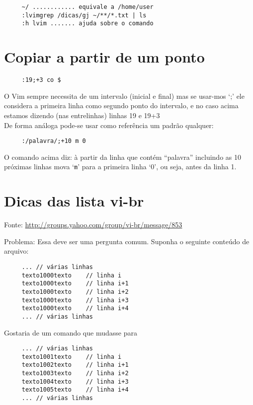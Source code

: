 \begin{verbatim}
     ~/ ............ equivale a /home/user
     :lvimgrep /dicas/gj ~/**/*.txt | ls
     :h lvim ....... ajuda sobre o comando
\end{verbatim}



\section{Copiar a partir de um ponto}

\begin{verbatim}
     :19;+3 co $
\end{verbatim}

O Vim sempre necessita de um intervalo (inicial e final) mas se usar-mos
`;' ele considera a primeira linha como segundo ponto do
intervalo, e no caso acima estamos dizendo (nas entrelinhas) linhas
19 e 19+3     \\


De forma análoga pode-se usar como referência um padrão qualquer:

\begin{verbatim}
     :/palavra/;+10 m 0
\end{verbatim}

O comando acima diz: à partir da linha que contém ``palavra'' incluindo as 10 próximas linhas
mova `{\tt m}' para a primeira linha `0', ou seja, antes da linha 1.

\section{Dicas das lista vi-br}

Fonte: \url{http://groups.yahoo.com/group/vi-br/message/853}

Problema:
Essa deve ser uma pergunta comum.
Suponha o seguinte conteúdo de arquivo:

\begin{verbatim}
     ... // várias linhas
     texto1000texto    // linha i
     texto1000texto    // linha i+1
     texto1000texto    // linha i+2
     texto1000texto    // linha i+3
     texto1000texto    // linha i+4
     ... // várias linhas
\end{verbatim}

Gostaria de um comando que mudasse para

\begin{verbatim}
     ... // várias linhas
     texto1001texto    // linha i
     texto1002texto    // linha i+1
     texto1003texto    // linha i+2
     texto1004texto    // linha i+3
     texto1005texto    // linha i+4
     ... // várias linhas
\end{verbatim}

